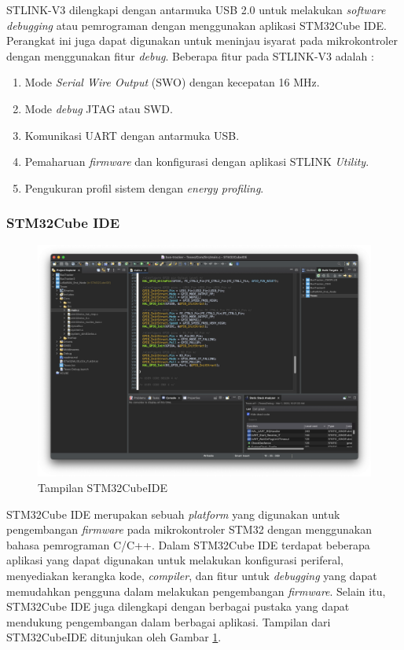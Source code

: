 STLINK-V3 dilengkapi dengan antarmuka USB 2.0 untuk melakukan \textit{software debugging} atau pemrograman dengan menggunakan aplikasi STM32Cube IDE. Perangkat ini juga dapat digunakan untuk meninjau isyarat pada mikrokontroler dengan menggunakan fitur \textit{debug}. Beberapa fitur pada STLINK-V3 adalah \cite{STMicroelectronics2023a}:

\begin{enumerate}
	\item Mode \textit{Serial Wire Output} (SWO) dengan kecepatan 16 MHz.
	\item Mode \textit{debug} JTAG atau SWD.
	\item Komunikasi UART dengan antarmuka USB.
	\item Pemaharuan \textit{firmware} dan konfigurasi dengan aplikasi STLINK \textit{Utility}.
	\item Pengukuran profil sistem dengan \textit{energy profiling}.
\end{enumerate}

\subsubsection{STM32Cube IDE}
\begin{figure}[H]
	\centering
	\includegraphics[width=12cm]{contents/chapter-2/stm32-ide.png}
	\caption{Tampilan STM32CubeIDE}
	\label{Fig: stm32-ide}
\end{figure}

STM32Cube IDE merupakan sebuah \textit{platform} yang digunakan untuk pengembangan \textit{firmware} pada mikrokontroler STM32 dengan menggunakan bahasa pemrograman C/C++. Dalam STM32Cube IDE terdapat beberapa aplikasi yang dapat digunakan untuk melakukan konfigurasi periferal, menyediakan kerangka kode, \textit{compiler}, dan fitur untuk \textit{debugging} yang dapat memudahkan pengguna dalam melakukan pengembangan \textit{firmware}. Selain itu, STM32Cube IDE juga dilengkapi dengan berbagai pustaka yang dapat mendukung pengembangan dalam berbagai aplikasi. Tampilan dari STM32CubeIDE ditunjukan oleh Gambar \ref{Fig: stm32-ide}.

